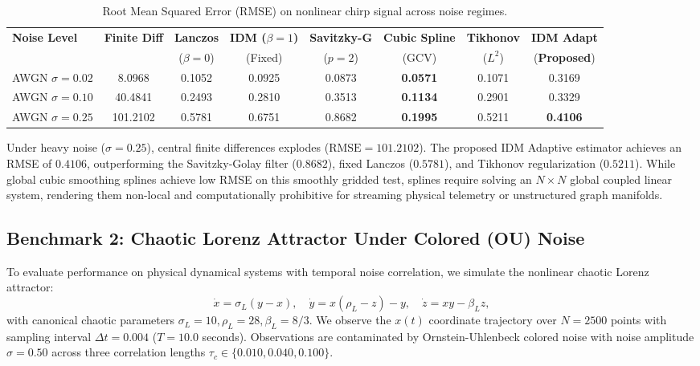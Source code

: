 \documentclass[11pt,a4paper]{article}
\theoremstyle{definition}
\begin{document}
\begin{table}[htbp]
\centering
\scriptsize
\setlength{\tabcolsep}{2.5pt}
\caption{Root Mean Squared Error (RMSE) on nonlinear chirp signal across noise regimes.}
\label{tab:chirp_results}
\begin{tabular*}{\textwidth}{@{\extracolsep{\fill}}lccccccc@{}}
\toprule
\textbf{Noise Level} & \textbf{Finite Diff} & \textbf{Lanczos} & \textbf{IDM ($\beta=1$)} & \textbf{Savitzky-G} & \textbf{Cubic Spline} & \textbf{Tikhonov} & \textbf{IDM Adapt} \\
& & ($\beta=0$) & (Fixed) & ($p=2$) & (GCV) & ($L^2$) & (\textbf{Proposed}) \\
\midrule
AWGN $\sigma = 0.02$ & 8.0968 & 0.1052 & 0.0925 & 0.0873 & \textbf{0.0571} & 0.1071 & 0.3169 \\
AWGN $\sigma = 0.10$ & 40.4841 & 0.2493 & 0.2810 & 0.3513 & \textbf{0.1134} & 0.2901 & 0.3329 \\
AWGN $\sigma = 0.25$ & 101.2102 & 0.5781 & 0.6751 & 0.8682 & \textbf{0.1995} & 0.5211 & \textbf{0.4106} \\
\bottomrule
\end{tabular*}
\end{table}

Under heavy noise ($\sigma = 0.25$), central finite differences explodes ($\text{RMSE} = 101.2102$). The proposed IDM Adaptive estimator achieves an RMSE of $0.4106$, outperforming the Savitzky-Golay filter ($0.8682$), fixed Lanczos ($0.5781$), and Tikhonov regularization ($0.5211$). While global cubic smoothing splines achieve low RMSE on this smoothly gridded test, splines require solving an $N \times N$ global coupled linear system, rendering them non-local and computationally prohibitive for streaming physical telemetry or unstructured graph manifolds.

\subsection{Benchmark 2: Chaotic Lorenz Attractor Under Colored (OU) Noise}
To evaluate performance on physical dynamical systems with temporal noise correlation, we simulate the nonlinear chaotic Lorenz attractor:
\begin{equation}
\dot{x} = \sigma_L (y - x), \quad \dot{y} = x(\rho_L - z) - y, \quad \dot{z} = xy - \beta_L z,
\end{equation}
with canonical chaotic parameters $\sigma_L = 10, \rho_L = 28, \beta_L = 8/3$. We observe the $x(t)$ coordinate trajectory over $N = 2500$ points with sampling interval $\Delta t = 0.004$ ($T = 10.0$ seconds). Observations are contaminated by Ornstein-Uhlenbeck colored noise with noise amplitude $\sigma = 0.50$ across three correlation lengths $\tau_c \in \{0.010, 0.040, 0.100\}$.
\end{document}
